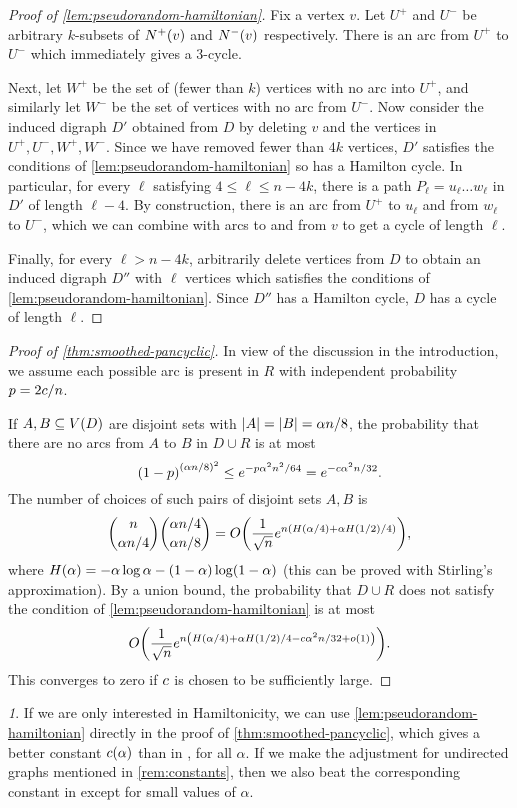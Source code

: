 \documentclass[11pt,english]{article}
\theoremstyle{plain}
\theoremstyle{definition}
\theoremstyle{definition}
\theoremstyle{plain}
\theoremstyle{plain}
\theoremstyle{plain}
\theoremstyle{plain}
\theoremstyle{remark}
\newtheorem{rem}[thm]{\protect\remarkname}
\theoremstyle{remark}
\let\originalleft\left
\let\originalright\right
\renewcommand{\left}{\mathopen{}\mathclose\bgroup\originalleft}
\renewcommand{\right}{\aftergroup\egroup\originalright}
\providecommand{\remarkname}{Remark}
\begin{document}
\begin{proof}
[Proof of \ref{lem:pseudorandom-hamiltonian}]Fix a vertex $v$. Let
$U^{+}$ and $U^{-}$ be arbitrary $k$-subsets of $N^{+}\left(v\right)$
and $N^{-}\left(v\right)$ respectively. There is an arc from $U^{+}$
to $U^{-}$ which immediately gives a 3-cycle.

Next, let $W^{+}$ be the set of (fewer than $k$) vertices with no
arc into $U^{+}$, and similarly let $W^{-}$ be the set of vertices
with no arc from $U^{-}$. Now consider the induced digraph $D'$
obtained from $D$ by deleting $v$ and the vertices in $U^{+},U^{-},W^{+},W^{-}$.
Since we have removed fewer than $4k$ vertices, $D'$ satisfies the
conditions of \ref{lem:pseudorandom-hamiltonian} so has a Hamilton
cycle. In particular, for every $\ell$ satisfying $4\le\ell\le n-4k$,
there is a path $P_{\ell}=u_{\ell}\dots w_{\ell}$ in $D'$ of length
$\ell-4$. By construction, there is an arc from $U^{+}$ to $u_{\ell}$
and from $w_{\ell}$ to $U^{-}$, which we can combine with arcs to
and from $v$ to get a cycle of length $\ell$.

Finally, for every $\ell>n-4k$, arbitrarily delete vertices from
$D$ to obtain an induced digraph $D''$ with $\ell$ vertices which
satisfies the conditions of \ref{lem:pseudorandom-hamiltonian}. Since
$D''$ has a Hamilton cycle, $D$ has a cycle of length $\ell$.
\end{proof}

\begin{proof}
[Proof of \ref{thm:smoothed-pancyclic}]In view of the discussion
in the introduction, we assume each possible arc is present in $R$
with independent probability $p=2c/n$.

If $A,B\subseteq V\left(D\right)$ are disjoint sets with $\left|A\right|=\left|B\right|=\alpha n/8$,
the probability that there are no arcs from $A$ to $B$ in $D\cup R$
is at most
\[
\left(1-p\right)^{\left(\alpha n/8\right)^{2}}\le e^{-p\alpha^{2}n^{2}/64}=e^{-\cdi\alpha^{2}n/32}.
\]
The number of choices of such pairs of disjoint sets $A,B$ is
\[
{n \choose \alpha n/4}{\alpha n/4 \choose \alpha n/8}=O\left(\frac{1}{\sqrt{n}}e^{n\left(H\left(\alpha/4\right)+\alpha H\left(1/2\right)/4\right)}\right),
\]
where $H\left(\alpha\right)=-\alpha\log\alpha-\left(1-\alpha\right)\log\left(1-\alpha\right)$
(this can be proved with Stirling's approximation). By a union bound,
the probability that $D\cup R$ does not satisfy the condition of
\ref{lem:pseudorandom-hamiltonian} is at most
\[
O\left(\frac{1}{\sqrt{n}}e^{n\left(H\left(\alpha/4\right)+\alpha H\left(1/2\right)/4-\cdi\alpha^{2}n/32+o\left(1\right)\right)}\right).
\]
This converges to zero if $c$ is chosen to
be sufficiently large.\end{proof}
\begin{rem}
If we are only interested in Hamiltonicity, we can use \ref{lem:pseudorandom-hamiltonian}
directly in the proof of \ref{thm:smoothed-pancyclic}, which gives
a better constant $\cdi\left(\alpha\right)$ than in \cite[Theorem~3]{BFM03},
for all $\alpha$. If we make the adjustment for undirected graphs
mentioned in \ref{rem:constants}, then we also beat the corresponding
constant in \cite[Theorem~1]{BFM03} except for small values of $\alpha$.
\end{rem}
\end{document}
